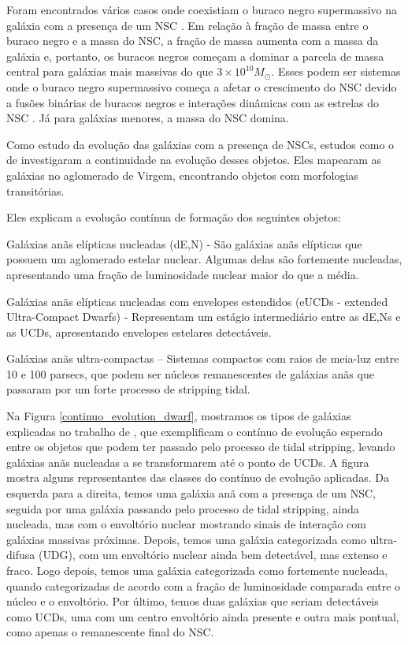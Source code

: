 Foram encontrados vários casos onde coexistiam o buraco negro supermassivo na galáxia com a presença de um NSC \citep{Graham_2009}. Em relação à fração de massa entre o buraco negro e a massa do NSC, a fração de massa aumenta com a massa da galáxia e, portanto, os buracos negros começam a dominar a parcela de massa central para galáxias mais massivas do que $3 \times 10^{10} M_{\odot}$. Esses podem ser sistemas onde o buraco negro supermassivo começa a afetar o crescimento do NSC devido a fusões binárias de buracos negros e interações dinâmicas com as estrelas do NSC \citep{Antonini_2015}. Já para galáxias menores, a massa do NSC domina.

Como estudo da evolução das galáxias com a presença de NSCs, estudos como o de \cite{Wang_2023} investigaram a continuidade na evolução desses objetos. Eles mapearam as galáxias no aglomerado de Virgem, encontrando objetos com morfologias transitórias.

\noindent Eles explicam a evolução contínua de formação dos seguintes objetos:

Galáxias anãs elípticas nucleadas (dE,N) - São galáxias anãs elípticas que possuem um aglomerado estelar nuclear. Algumas delas são fortemente nucleadas, apresentando uma fração de luminosidade nuclear maior do que a média.

Galáxias anãs elípticas nucleadas com envelopes estendidos (eUCDs - extended Ultra-Compact Dwarfs) - Representam um estágio intermediário entre as dE,Ns e as UCDs, apresentando envelopes estelares detectáveis.

Galáxias anãs ultra-compactas – Sistemas compactos com raios de meia-luz entre 10 e 100 parsecs, que podem ser núcleos remanescentes de galáxias anãs que passaram por um forte processo de stripping tidal.

Na Figura \ref{continuo_evolution_dwarf}, mostramos os tipos de galáxias explicadas no trabalho de \cite{Wang_2023}, que exemplificam o contínuo de evolução esperado entre os objetos que podem ter passado pelo processo de tidal stripping, levando galáxias anãs nucleadas a se transformarem até o ponto de UCDs. A figura mostra alguns representantes das classes do contínuo de evolução aplicadas. Da esquerda para a direita, temos uma galáxia anã com a presença de um NSC, seguida por uma galáxia passando pelo processo de tidal stripping, ainda nucleada, mas com o envoltório nuclear mostrando sinais de interação com galáxias massivas próximas. Depois, temos uma galáxia categorizada como ultra-difusa (\ac{UDG}), com um envoltório nuclear ainda bem detectável, mas extenso e fraco. Logo depois, temos uma galáxia categorizada como fortemente nucleada, quando categorizadas de acordo com a fração de luminosidade comparada entre o núcleo e o envoltório. Por último, temos duas galáxias que seriam detectáveis como UCDs, uma com um centro envoltório ainda presente e outra mais pontual, como apenas o remanescente final do NSC.

